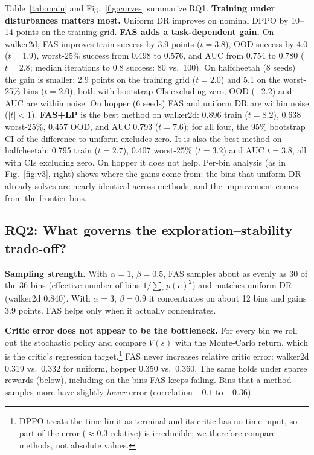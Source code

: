 \documentclass{article}
\newcommand{\fas}{\textsc{FAS}}
\begin{document}
Table~\ref{tab:main} and Fig.~\ref{fig:curves} summarize RQ1.
\textbf{Training under disturbances matters most.} Uniform DR improves on nominal DPPO by 10--14 points on the training grid.
\textbf{\fas{} adds a task-dependent gain.} On walker2d, \fas{} improves train success by 3.9 points ($t=3.8$), OOD success by 4.0 ($t=1.9$), worst-25\% success from 0.498 to 0.576, and AUC from 0.754 to 0.780 ($t=2.8$; median iterations to 0.8 success: 80 vs.\ 100).
On halfcheetah (8 seeds) the gain is smaller: 2.9 points on the training grid ($t=2.0$) and 5.1 on the worst-25\% bins ($t=2.0$), both with bootstrap CIs excluding zero; OOD ($+2.2$) and AUC are within noise. On hopper (6 seeds) \fas{} and uniform DR are within noise ($|t|<1$).
\textbf{\fas{}+LP} is the best method on walker2d: 0.896 train ($t=8.2$), 0.638 worst-25\%, 0.457 OOD, and AUC 0.793 ($t=7.6$); for all four, the 95\% bootstrap CI of the difference to uniform excludes zero.
It is also the best method on halfcheetah: 0.795 train ($t=2.7$), 0.407 worst-25\% ($t=3.2$) and AUC $t=3.8$, all with CIs excluding zero. On hopper it does not help.
Per-bin analysis (as in Fig.~\ref{fig:v3}, right) shows where the gains come from: the bins that uniform DR already solves are nearly identical across methods, and the improvement comes from the frontier bins.

\subsection{RQ2: What governs the exploration--stability trade-off?}
\label{sec:rq2}

\textbf{Sampling strength.} With $\alpha=1$, $\beta=0.5$, \fas{} samples about as evenly as 30 of the 36 bins (effective number of bins $1/\sum_c p(c)^2$) and matches uniform DR (walker2d 0.840).
With $\alpha=3$, $\beta=0.9$ it concentrates on about 12 bins and gains 3.9 points. \fas{} helps only when it actually concentrates.

\textbf{Critic error does not appear to be the bottleneck.} For every bin we roll out the stochastic policy and compare $V(s)$ with the Monte-Carlo return, which is the critic's regression target.\footnote{DPPO treats the time limit as terminal and its critic has no time input, so part of the error ($\approx$0.3 relative) is irreducible; we therefore compare methods, not absolute values.}
\fas{} never increases relative critic error: walker2d 0.319 vs.\ 0.332 for uniform, hopper 0.350 vs.\ 0.360.
The same holds under sparse rewards (below), including on the bins \fas{} keeps failing.
Bins that a method samples more have slightly \emph{lower} error (correlation $-0.1$ to $-0.36$).
\end{document}
